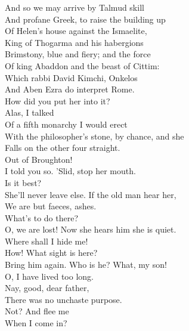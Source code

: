 \documentclass[a4paper,oneside,12pt]{memoir}
\begin{document}
\begin{drama*}
\dolspeaks And so we may arrive by Talmud skill\\
And profane Greek, to raise the building up\\
Of Helen's house against the Ismaelite,\\
King of Thogarma and his habergions\\
Brimstony, blue and fiery; and the force\\
Of king Abaddon and the beast of Cittim:\\
Which rabbi David Kimchi, Onkelos\\
And Aben Ezra do interpret Rome.\\
\facespeaks How did you put her into it?\\
\mammonspeaks {} Alas, I talked\\
Of a fifth monarchy I would erect\\
With the philosopher's stone, by chance, and she\\
Falls on the other four straight.\\
\facespeaks {} Out of Broughton!\\
I told you so. 'Slid, stop her mouth.\\
\mammonspeaks {} Is it best?\\
\facespeaks She'll never leave else. If the old man hear her,\\
We are but faeces, ashes.\\
\subtlespeaks {}  What's to do there?\\
\facespeaks O, we are lost! Now she hears him she is quiet.\\
\mammonspeaks Where shall I hide me!\\
\subtlespeaks {} How! What sight is here?\\
Bring him again. Who is he? What, my son!\\
O, I have lived too long.\\
\mammonspeaks {} Nay, good, dear father,\\
There was no unchaste purpose.\\
\subtlespeaks {} Not? And flee me\\
When I come in?\\

\end{drama*}
\end{document}
